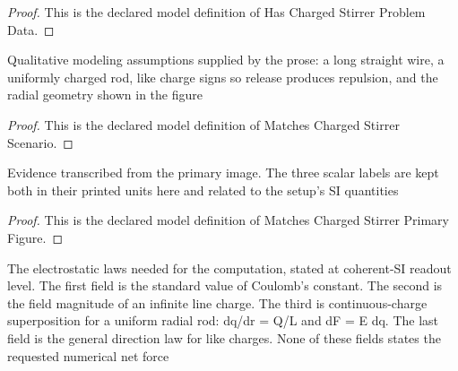 \begin{proof}
  This is the declared model definition of Has Charged Stirrer Problem Data.
\end{proof}
\begin{definition}
  \label{def:physics:phyx-mini-0839:phyxminiproblems-problemphyxmini0839-matcheschargedstirrerscenario}
  Qualitative modeling assumptions supplied by the prose: a long straight wire, a uniformly charged rod, like charge signs so release produces repulsion, and the radial geometry shown in the figure
\end{definition}
\begin{proof}
  This is the declared model definition of Matches Charged Stirrer Scenario.
\end{proof}
\begin{definition}
  \label{def:physics:phyx-mini-0839:phyxminiproblems-problemphyxmini0839-matcheschargedstirrerprimaryfigure}
  Evidence transcribed from the primary image. The three scalar labels are kept both in their printed units here and related to the setup's SI quantities
\end{definition}
\begin{proof}
  This is the declared model definition of Matches Charged Stirrer Primary Figure.
\end{proof}
\begin{definition}
  \label{def:physics:phyx-mini-0839:phyxminiproblems-problemphyxmini0839-satisfiesinfinitelinechargeelectrostatics}
  The electrostatic laws needed for the computation, stated at coherent-SI readout level. The first field is the standard value of Coulomb's constant. The second is the field magnitude of an infinite line charge. The third is continuous-charge superposition for a uniform radial rod: dq/dr = Q/L and dF = E dq. The last field is the general direction law for like charges. None of these fields states the requested numerical net force
\end{definition}
